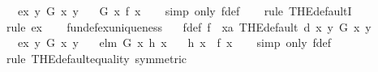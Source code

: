 \begin{isabellebody}
\ \ \ ex{}{\isacharcolon}{\kern0pt}\ {\isachardoublequoteopen}{\isasymexists}{\isacharbang}{\kern0pt}y{\isachardot}{\kern0pt}\ G\ x\ y{\isachardoublequoteclose}\isanewline
\ \ \ {\isachardoublequoteopen}G\ x\ {\isacharparenleft}{\kern0pt}f\ x{\isacharparenright}{\kern0pt}{\isachardoublequoteclose}\isanewline
%
\isadelimproof
\ \ %
\endisadelimproof
%
\isatagproof
{}\isamarkupfalse%
\ {\isacharparenleft}{\kern0pt}simp\ only{\isacharcolon}{\kern0pt}\ f{\isacharunderscore}{\kern0pt}def{\isacharparenright}{\kern0pt}\isanewline
\ \ \isamarkupfalse%
\ {\isacharparenleft}{\kern0pt}rule\ THE{\isacharunderscore}{\kern0pt}defaultI{\isacharprime}{\kern0pt}{\isacharparenright}{\kern0pt}\isanewline
\ \ \isamarkupfalse%
\ {\isacharparenleft}{\kern0pt}rule\ ex{}{\isacharparenright}{\kern0pt}\isanewline
\ \ \isamarkupfalse%
%
\endisatagproof
{\isafoldproof}%
%
\isadelimproof
\isanewline
%
\endisadelimproof
\isanewline
{}\isamarkupfalse%
\ fundef{\isacharunderscore}{\kern0pt}ex{}{\isacharunderscore}{\kern0pt}uniqueness{\isacharcolon}{\kern0pt}\isanewline
\ \ \ f{\isacharunderscore}{\kern0pt}def{\isacharcolon}{\kern0pt}\ {\isachardoublequoteopen}f\ {\isasymequiv}\ {\isacharparenleft}{\kern0pt}{\isasymlambda}x{\isacharcolon}{\kern0pt}{\isacharcolon}{\kern0pt}{\isacharprime}{\kern0pt}a{\isachardot}{\kern0pt}\ THE{\isacharunderscore}{\kern0pt}default\ {\isacharparenleft}{\kern0pt}d\ x{\isacharparenright}{\kern0pt}\ {\isacharparenleft}{\kern0pt}{\isasymlambda}y{\isachardot}{\kern0pt}\ G\ x\ y{\isacharparenright}{\kern0pt}{\isacharparenright}{\kern0pt}{\isachardoublequoteclose}\isanewline
\ \ \ ex{}{\isacharcolon}{\kern0pt}\ {\isachardoublequoteopen}{\isasymexists}{\isacharbang}{\kern0pt}y{\isachardot}{\kern0pt}\ G\ x\ y{\isachardoublequoteclose}\isanewline
\ \ \ elm{\isacharcolon}{\kern0pt}\ {\isachardoublequoteopen}G\ x\ {\isacharparenleft}{\kern0pt}h\ x{\isacharparenright}{\kern0pt}{\isachardoublequoteclose}\isanewline
\ \ \ {\isachardoublequoteopen}h\ x\ {\isacharequal}{\kern0pt}\ f\ x{\isachardoublequoteclose}\isanewline
%
\isadelimproof
\ \ %
\endisadelimproof
%
\isatagproof
{}\isamarkupfalse%
\ {\isacharparenleft}{\kern0pt}simp\ only{\isacharcolon}{\kern0pt}\ f{\isacharunderscore}{\kern0pt}def{\isacharparenright}{\kern0pt}\isanewline
\ \ \isamarkupfalse%
\ {\isacharparenleft}{\kern0pt}rule\ THE{\isacharunderscore}{\kern0pt}default{}{\isacharunderscore}{\kern0pt}equality\ {\isacharbrackleft}{\kern0pt}symmetric{\isacharbrackright}{\kern0pt}{\isacharparenright}{\kern0pt}\isanewline

\end{isabellebody}
